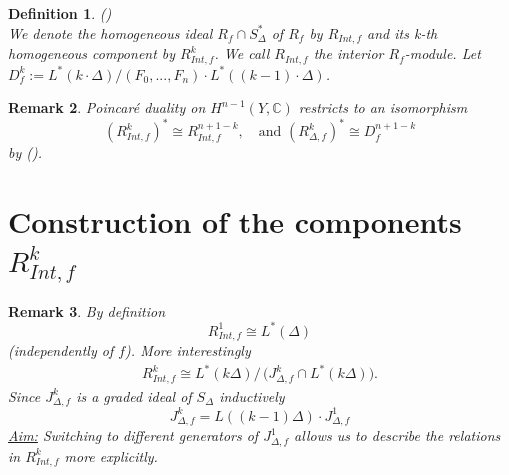 \documentclass[12pt, english]{article}
\newtheorem{definition}{Definition}[section]
\newtheorem{remark}[definition]{Remark}
\begin{document}
\begin{definition} \label{definition_R_Int_f_k} (\cite[Prop.9.0.6]{Bat93}) \\
	We denote the homogeneous ideal $R_f \cap S_{\Delta}^*$ of $R_{f}$ by $R_{Int,f}$ and its k-th homogeneous component by $R_{Int,f}^k$. We call $R_{Int,f}$ the \textit{interior $R_{f}$-module}. Let $D_f^k := L^*(k \cdot \Delta)/(F_0,...,F_n) \cdot L^*((k-1) \cdot \Delta)$.
\end{definition}

\begin{remark} \label{remark_duality_Poincare_duality}
	\normalfont
	Poincaré duality on $H^{n-1}(Y,\mathbb{C})$ restricts to an isomorphism
	\[ (R_{Int,f}^k)^* \cong R_{Int,f}^{n+1-k}, \quad \textrm{and } (R_{\Delta,f}^k)^* \cong D_f^{n+1-k}  \]
	by (\cite[Remark 9.5, Prop.9.7]{Bat93}). %
\end{remark}







\section{Construction of the components $R_{Int,f}^k$} \label{section_examples_comp_jac_ring_interor_module}



\begin{remark}
	\normalfont	
	By definition
	\[ R_{Int,f}^1 \cong L^*(\Delta) \] 
	(independently of $f$). More interestingly
	\begin{align} \label{formula_RDelta_Int_2_relations_Jf_Delta}
		R_{Int,f}^k \cong L^{*}(k \Delta) \big/ \, \Big( J_{\Delta,f}^k \cap L^{*}(k \Delta) \Big).
	\end{align}
	Since $J_{\Delta,f}^k$ is a graded ideal of $S_{\Delta}$ inductively
	\[ J_{\Delta,f}^k = L((k-1)\Delta) \cdot J_{\Delta,f}^1  \]
	\underline{Aim:} Switching to different generators of $J_{\Delta,f}^1$ allows us to describe the relations in $R_{Int,f}^k$ more explicitly.
	
\end{remark}
\end{document}
